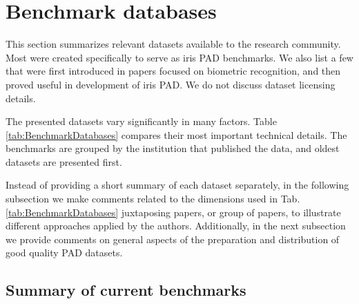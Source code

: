 \documentclass[format=acmsmall, review=false, timestamp=false]{acmart}
\begin{document}
\section{Benchmark databases}
\label{sec:BenchmarkDatabases}

This section summarizes relevant datasets available to the research community. Most were created specifically to serve as iris PAD benchmarks. We also list a few that were first introduced in papers focused on biometric recognition, and then proved useful in development of iris PAD. We do not discuss {dataset} licensing details. 

The presented datasets vary significantly in many factors.  Table \ref{tab:BenchmarkDatabases} compares their most important technical details. The benchmarks are grouped by the institution that published the data, and oldest datasets are presented first.

Instead of providing a short summary of each dataset separately, in the following subsection we make comments related to the dimensions used in Tab. \ref{tab:BenchmarkDatabases} juxtaposing papers, or group of papers, to illustrate different approaches applied by the authors. Additionally, in the next subsection we provide comments on general aspects of the preparation and distribution of good quality PAD datasets.


\subsection{Summary of current benchmarks}
\end{document}
